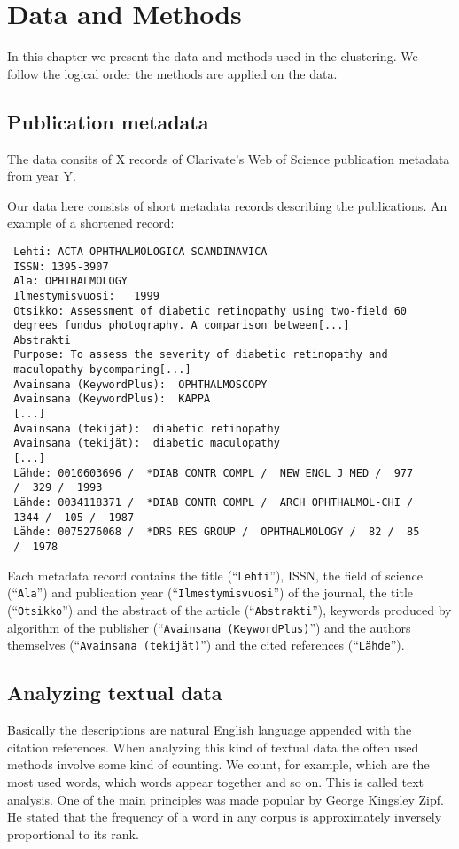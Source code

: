 \chapter{Data and Methods}
\label{chapter:methods}
In this chapter we present the data and methods used in the 
clustering. We follow the logical order the methods are applied on 
the data.

\section{Publication metadata}
\label{section:metadata}
The data consits of X records of Clarivate's Web of Science 
publication metadata from year Y.

Our data here consists of short metadata records describing the 
publications. An example of a shortened record:
\begin{verbatim}
 Lehti: ACTA OPHTHALMOLOGICA SCANDINAVICA
 ISSN: 1395-3907
 Ala: OPHTHALMOLOGY
 Ilmestymisvuosi:   1999
 Otsikko: Assessment of diabetic retinopathy using two-field 60 
 degrees fundus photography. A comparison between[...]
 Abstrakti
 Purpose: To assess the severity of diabetic retinopathy and 
 maculopathy bycomparing[...]
 Avainsana (KeywordPlus):  OPHTHALMOSCOPY
 Avainsana (KeywordPlus):  KAPPA
 [...]
 Avainsana (tekijät):  diabetic retinopathy
 Avainsana (tekijät):  diabetic maculopathy
 [...]
 Lähde: 0010603696 /  *DIAB CONTR COMPL /  NEW ENGL J MED /  977 
 /  329 /  1993
 Lähde: 0034118371 /  *DIAB CONTR COMPL /  ARCH OPHTHALMOL-CHI /  
 1344 /  105 /  1987
 Lähde: 0075276068 /  *DRS RES GROUP /  OPHTHALMOLOGY /  82 /  85 
 /  1978
 \end{verbatim}
 
Each metadata record contains the title (``\texttt{Lehti}''), 
ISSN, the field of science (``\texttt{Ala}'') and publication 
year (``\texttt{Ilmestymisvuosi}'') of the journal, the title 
(``\texttt{Otsikko}'') and the abstract of the article 
(``\texttt{Abstrakti}''), keywords produced by algorithm 
of the publisher (``\texttt{Avainsana (KeywordPlus)}'') and the 
authors themselves (``\texttt{Avainsana (tekijät)}'') and the 
cited references (``\texttt{Lähde}''). 


 
\section{Analyzing textual data}
Basically the descriptions are natural English 
language appended with the citation references. When analyzing 
this kind of textual data the often used methods involve some 
kind of counting. We count, for example, which
are the most used words, which words appear together and so on.
This is called text analysis. One of the main principles was made 
popular by George Kingsley Zipf. He stated that the frequency of 
a word in any corpus is approximately inversely proportional to 
its rank. 

